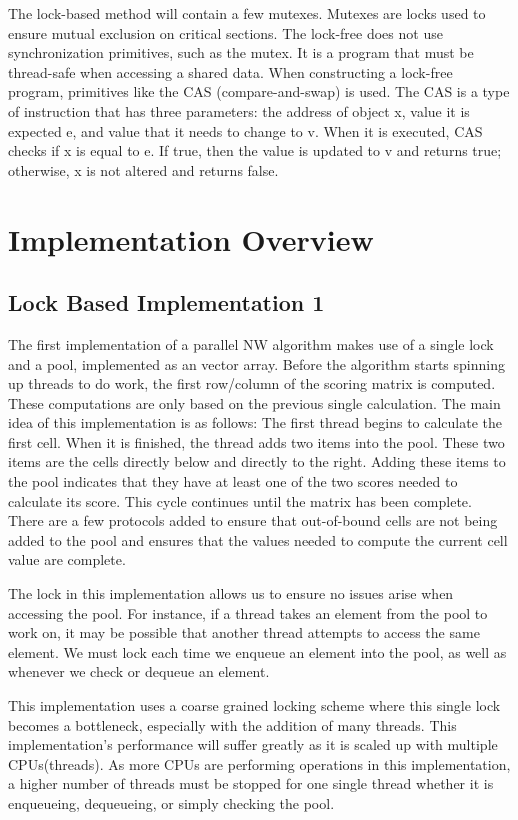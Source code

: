 \documentclass[letterpaper, 10 pt, conference]{IEEEconf}
\begin{document}
The lock-based method will contain a few mutexes. Mutexes are locks used to ensure mutual exclusion on critical sections. The lock-free does not use synchronization primitives, such as the mutex. It is a program that must be thread-safe when accessing a shared data. When constructing a lock-free program, primitives like the CAS (compare-and-swap) is used. The CAS is a type of instruction that has three parameters: the address of object x, value it is expected e, and value that it needs to change to v. When it is executed, CAS checks if x is equal to e. If true, then the value is updated to v and returns true; otherwise, x is not altered and returns false. 

\section{Implementation Overview}
\subsection{Lock Based Implementation 1}
The first implementation of a parallel NW algorithm makes use of a single lock and a pool, implemented as an vector array. Before the algorithm starts spinning up threads to do work, the first row/column of the scoring matrix is computed. These computations are only based on the previous single calculation. The main idea of this implementation is as follows: The first thread begins to calculate the first cell. When it is finished, the thread adds two items into the pool. These two items are the cells directly below and directly to the right. Adding these items to the pool indicates that they have at least one of the two scores needed to calculate its score. This cycle continues until the matrix has been complete. There are a few protocols added to ensure that out-of-bound cells are not being added to the pool and ensures that the values needed to compute the current cell value are complete. 

The lock in this implementation allows us to ensure no issues arise when accessing the pool. For instance, if a thread takes an element from the pool to work on, it may be possible that another thread attempts to access the same element. We must lock each time we enqueue an element into the pool, as well as whenever we check or dequeue an element. 

This implementation uses a coarse grained locking scheme where this single lock becomes a bottleneck, especially with the addition of many threads. This implementation's performance will suffer greatly as it is scaled up with multiple CPUs(threads). As more CPUs are performing operations in this implementation, a higher number of threads must be stopped for one single thread whether it is enqueueing, dequeueing, or simply checking the pool. 
\end{document}
